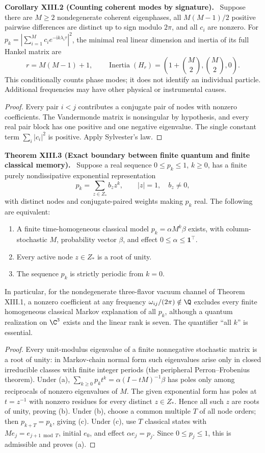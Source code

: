 \documentclass[11pt,a4paper,oneside]{book}
\newcommand{\one}{\mathbf 1}\newcommand{\ii}{\mathrm i}\newcommand{\dd}{\mathrm d}
\newcommand{\statement}[3]{\par\medskip\noindent\textbf{#1 #2 (#3).}\ }
\begin{document}
\statement{Corollary}{XIII.2}{Counting coherent modes by signature} Suppose there are $M\ge2$ nondegenerate coherent eigenphases, all $M(M-1)/2$ positive pairwise differences are distinct up to sign modulo $2\pi$, and all $c_i$ are nonzero. For $p_k=|\sum_{i=1}^Mc_i e^{-\ii k\lambda_i\tau}|^2$, the minimal real linear dimension and inertia of its full Hankel matrix are
\[r=M(M-1)+1,\qquad\operatorname{Inertia}(H_r)=\left(1+\binom M2,\binom M2,0\right).\]
This conditionally counts phase modes; it does not identify an individual particle. Additional frequencies may have other physical or instrumental causes.
\begin{proof}Every pair $i<j$ contributes a conjugate pair of nodes with nonzero coefficients. The Vandermonde matrix is nonsingular by hypothesis, and every real pair block has one positive and one negative eigenvalue. The single constant term $\sum_i|c_i|^2$ is positive. Apply Sylvester's law.\end{proof}
\statement{Theorem}{XIII.3}{Exact boundary between finite quantum and finite classical memory} Suppose a real sequence $0\le p_k\le1$, $k\ge0$, has a finite purely nondissipative exponential representation
\[p_k=\sum_{z\in Z_*}b_z z^k,\qquad |z|=1,\quad b_z\ne0,\]
with distinct nodes and conjugate-paired weights making $p_k$ real. The following are equivalent:
\begin{enumerate}[label=(\alph*)]
\item A finite time-homogeneous classical model $p_k=\alpha M^k\beta$ exists, with column-stochastic $M$, probability vector $\beta$, and effect $0\le\alpha\le\one^\top$.
\item Every active node $z\in Z_*$ is a root of unity.
\item The sequence $p_k$ is strictly periodic from $k=0$.
\end{enumerate}
In particular, for the nondegenerate three-flavor vacuum channel of Theorem XIII.1, a nonzero coefficient at any frequency $\omega_{ij}/(2\pi)\notin\Q$ excludes every finite homogeneous classical Markov explanation of all $p_k$, although a quantum realization on $\C^3$ exists and the linear rank is seven. The quantifier ``all $k$'' is essential.
\begin{proof}Every unit-modulus eigenvalue of a finite nonnegative stochastic matrix is a root of unity: in Markov-chain normal form such eigenvalues arise only in closed irreducible classes with finite integer periods (the peripheral Perron--Frobenius theorem). Under (a), $\sum_{k\ge0}p_kt^k=\alpha(I-tM)^{-1}\beta$ has poles only among reciprocals of nonzero eigenvalues of $M$. The given exponential form has poles at $t=z^{-1}$ with nonzero residues for every distinct $z\in Z_*$. Hence all such $z$ are roots of unity, proving (b). Under (b), choose a common multiple $T$ of all node orders; then $p_{k+T}=p_k$, giving (c). Under (c), use $T$ classical states with $Me_j=e_{j+1\bmod T}$, initial $e_0$, and effect $\alpha e_j=p_j$. Since $0\le p_j\le1$, this is admissible and proves (a).\end{proof}
\end{document}
